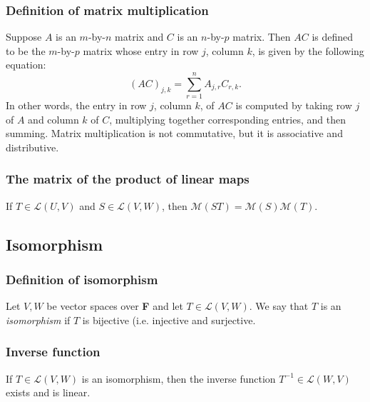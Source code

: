 \documentclass[11pt]{article}
\begin{document}
    \subsubsection{Definition of matrix multiplication}

    Suppose $A$ is an $m$-by-$n$ matrix and $C$ is an $n$-by-$p$ matrix. Then $AC$ is defined to be the $m$-by-$p$ matrix whose entry in row $j$, column $k$, is given by the following equation: \[(AC)_{j,k} = \sum_{r=1}^{n} A_{j,r} C_{r,k}.\] In other words, the entry in row $j$, column $k$, of $AC$ is computed by taking row $j$ of $A$ and column $k$ of $C$, multiplying together corresponding entries, and then summing. Matrix multiplication is not commutative, but it is associative and distributive. 

    \subsubsection{The matrix of the product of linear maps}

    If \(T \in \mathcal{L}(U,V)\) and \(S \in \mathcal{L}(V,W)\), then \(\mathcal{M}(ST) = \mathcal{M}(S) \mathcal{M}(T)\). 

    \subsection{Isomorphism}

    \subsubsection{Definition of isomorphism}

    Let $V,W$ be vector spaces over \textbf{F} and let \(T \in \mathcal{L}(V,W)\). We say that $T$ is an \emph{isomorphism} if $T$ is bijective (i.e. injective and surjective. 

    \subsubsection{Inverse function}

    If \(T \in \mathcal{L}(V,W)\) is an isomorphism, then the inverse function \(T^{-1} \in \mathcal{L}(W,V)\) exists and is linear.

    \vspace{1em}
\end{document}
